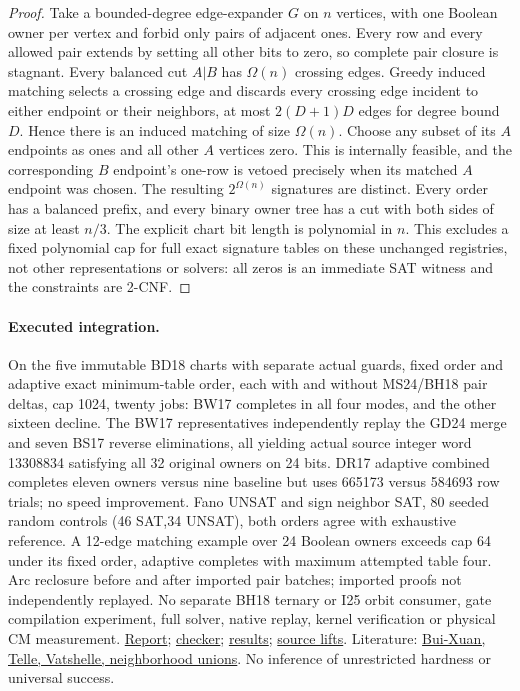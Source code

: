 \documentclass[11pt]{article}
\begin{document}
\begin{proof}
Take a bounded-degree edge-expander $G$ on $n$ vertices, with one Boolean owner per vertex and forbid only pairs of adjacent ones. Every row and every allowed pair extends by setting all other bits to zero, so complete pair closure is stagnant. Every balanced cut $A|B$ has $\Omega(n)$ crossing edges. Greedy induced matching selects a crossing edge and discards every crossing edge incident to either endpoint or their neighbors, at most $2(D+1)D$ edges for degree bound $D$. Hence there is an induced matching of size $\Omega(n)$. Choose any subset of its $A$ endpoints as ones and all other $A$ vertices zero. This is internally feasible, and the corresponding $B$ endpoint's one-row is vetoed precisely when its matched $A$ endpoint was chosen. The resulting $2^{\Omega(n)}$ signatures are distinct. Every order has a balanced prefix, and every binary owner tree has a cut with both sides of size at least $n/3$. The explicit chart bit length is polynomial in $n$. This excludes a fixed polynomial cap for full exact signature tables on these unchanged registries, not other representations or solvers: all zeros is an immediate SAT witness and the constraints are 2-CNF.
\end{proof}
\paragraph{Executed integration.}
On the five immutable BD18 charts with separate actual guards, fixed order and adaptive exact minimum-table order, each with and without MS24/BH18 pair deltas, cap 1024, twenty jobs: BW17 completes in all four modes, and the other sixteen decline. The BW17 representatives independently replay the GD24 merge and seven BS17 reverse eliminations, all yielding actual source integer word 13308834 satisfying all 32 original owners on 24 bits. DR17 adaptive combined completes eleven owners versus nine baseline but uses 665173 versus 584693 row trials; no speed improvement. Fano UNSAT and sign neighbor SAT, 80 seeded random controls (46 SAT,34 UNSAT), both orders agree with exhaustive reference. A 12-edge matching example over 24 Boolean owners exceeds cap 64 under its fixed order, adaptive completes with maximum attempted table four. Arc reclosure before and after imported pair batches; imported proofs not independently replayed. No separate BH18 ternary or I25 orbit consumer, gate compilation experiment, full solver, native replay, kernel verification or physical CM measurement. \href{https://github.com/j15marti/pnp/commit/f0f899889a693e4008cec2528794f784169acd5f}{Report}; \href{https://github.com/j15marti/pnp/commit/ee8bed6de58859a0c2af4f5a75039871916f5818}{checker}; \href{https://github.com/j15marti/pnp/commit/6460a55a0e8c8b6b1d3a033929f0269017b1605b}{results}; \href{https://github.com/j15marti/pnp/commit/44af47213020ec3acf8f1522ba97fc2ba6675c76}{source lifts}. Literature: \href{https://arxiv.org/abs/0903.4796}{Bui-Xuan, Telle, Vatshelle, neighborhood unions}. No inference of unrestricted hardness or universal success.
\end{document}
